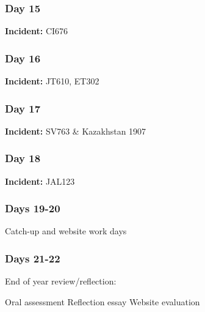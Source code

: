 \documentclass[12pt]{article}
\begin{document}
\subsubsection{Day 15}
\textbf{Incident:} CI676
\subsubsection{Day 16}
\textbf{Incident:} JT610, ET302
\subsubsection{Day 17}
\textbf{Incident:} SV763 \& Kazakhstan 1907
\subsubsection{Day 18}
\textbf{Incident:} JAL123
\subsubsection{Days 19-20}
Catch-up and website work days
\subsubsection{Days 21-22}
End of year review/reflection:
\begin{outline}
    \1 Oral assessment
\1 Reflection essay
\1 Website evaluation
\end{outline}
\end{document}
